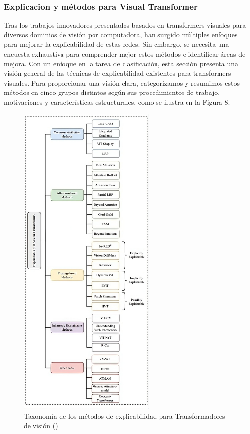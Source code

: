 \subsubsection{ Explicacion y métodos para Visual Transformer} 
Tras los trabajos innovadores presentados basados en transformers visuales para diversos dominios de visión por computadora, han surgido múltiples enfoques para mejorar la explicabilidad de estas redes. Sin embargo, se necesita una encuesta exhaustiva para comprender mejor estos métodos e identificar áreas de mejora. Con un enfoque en la tarea de clasificación, esta sección presenta una visión general de las técnicas de explicabilidad existentes para transformers visuales. Para proporcionar una visión clara, categorizamos y resumimos estos métodos en cinco grupos distintos según sus procedimientos de trabajo, motivaciones y características estructurales, como se ilustra en la Figura 8.
\begin{figure}[H]
	\begin{center}
		\includegraphics[width=0.6\textwidth]{2/figures/vt2.jpeg}
		\caption{ Taxonomía de los métodos de explicabilidad para
			Transformadores de visión (\cite{tecnica1})}
	\end{center}
\end{figure}


